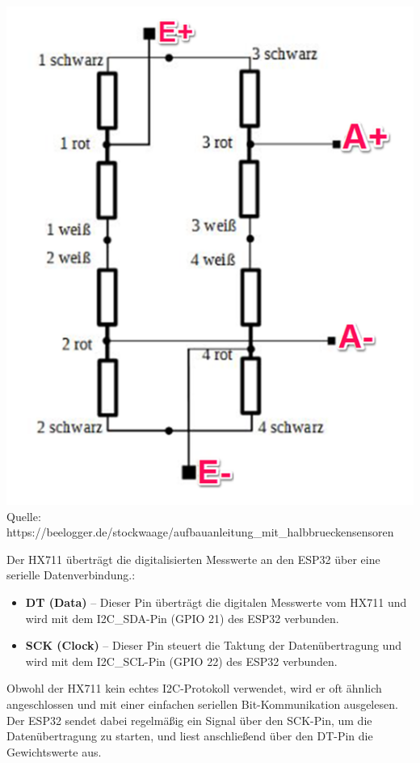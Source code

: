 \documentclass[ngerman,12pt,a4paper]{article}
\begin{document}
		\begin{center}
			\begin{minipage}{0.6\textwidth}
				\centering
				\includegraphics[width=\textwidth]{Pictures/beschaltung_waegezelle}
				\label{fig:beschaltung_waegezelle}
				\vspace{-3pt}
				{\small Quelle:\\ {https://beelogger.de/stockwaage/aufbauanleitung\_mit\_halbbrueckensensoren}}
			\end{minipage}
		\end{center}
		\newpage
		\noindent
		Der HX711 überträgt die digitalisierten Messwerte an den ESP32 über eine serielle Datenverbindung.:
		\begin{itemize}
			\item \textbf{DT (Data)} – Dieser Pin überträgt die digitalen Messwerte vom HX711 und wird mit dem I2C\_SDA-Pin (GPIO 21) des ESP32 verbunden.
			\item \textbf{SCK (Clock)} – Dieser Pin steuert die Taktung der Datenübertragung und wird mit dem I2C\_SCL-Pin (GPIO 22) des ESP32 verbunden.
		\end{itemize}
		Obwohl der HX711 kein echtes I2C-Protokoll verwendet, wird er oft ähnlich angeschlossen und mit einer einfachen seriellen Bit-Kommunikation ausgelesen. Der ESP32 sendet dabei regelmäßig ein Signal über den SCK-Pin, um die Datenübertragung zu starten, und liest anschließend über den DT-Pin die Gewichtswerte aus. \\[0.5cm]
		
\end{document}
